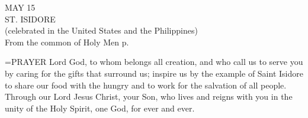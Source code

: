 \begin{center}\normalsize MAY 15\\
\footnotesize ST. ISIDORE\\
\footnotesize (celebrated in the United States and the Philippines)\\
\footnotesize From the common of Holy Men p. \\
\end{center}

\hangindent=\parindent \small{PRAYER 
Lord God, to whom belongs all creation,
and who call us to serve you
by caring for the gifts that surround us;
inspire us by the example of Saint Isidore
to share our food with the hungry
and to work for the salvation of all people.
Through our Lord Jesus Christ, your Son,
who lives and reigns with you in the unity of the Holy Spirit,
one God, for ever and ever.\\}
 
